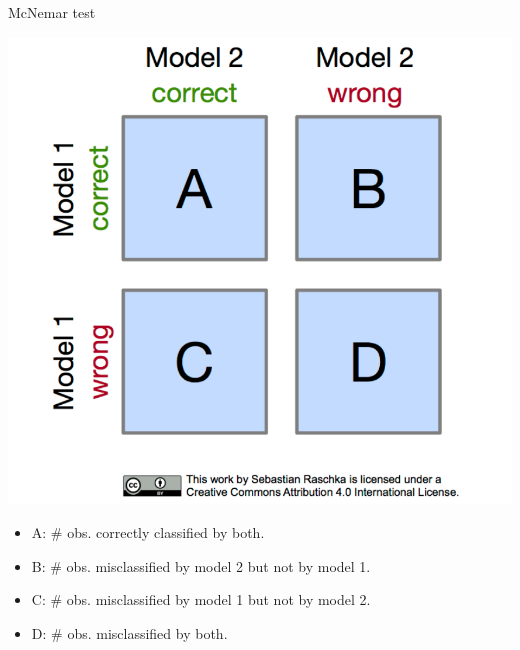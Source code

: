 \begin{vbframe}{McNemar test}
\begin{minipage}{0.34\textwidth}
\includegraphics[width=\textwidth]{figure_man/mcnemar_1.png} \end{minipage}
\begin{minipage}{0.64\textwidth}
\begin{itemize}
\item A: $\#$ obs. correctly classified by both.
\item B: $\#$ obs. misclassified by model 2 but not by model 1.
\item C: $\#$ obs. misclassified by model 1 but not by model 2.
\item D: $\#$ obs. misclassified by both.
\end{itemize}
\end{minipage}
%

\end{vbframe}
